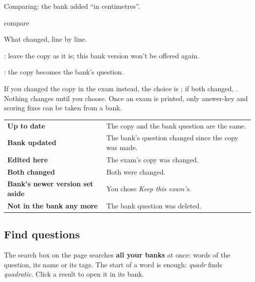 \documentclass[11pt]{article}
\begin{document}
\begin{keep}
\begin{guidefig}{Comparing: the bank added ``in centimetres''.}
\begin{shot}{compare}
\end{shot}
\end{guidefig}
\begin{callouts}
  \item What changed, line by line.
  \item {}: leave the copy as it is; this bank version won't be offered again.
  \item {}: the copy becomes the bank's question.
\end{callouts}
\end{keep}

If you changed the copy in the exam instead, the choice is ; if both changed, . Nothing changes until you choose. Once an exam is printed, only answer-key and scoring fixes can be taken from a bank.

\begin{panel}
\renewcommand{\arraystretch}{1.3}\small
\begin{tabularx}{\linewidth}{@{}>{\bfseries}p{52mm}X@{}}
Up to date & The copy and the bank question are the same.\\
Bank updated & The bank's question changed since the copy was made.\\
Edited here & The exam's copy was changed.\\
Both changed & Both were changed.\\
Bank's newer version set aside & You chose \emph{Keep this exam's}.\\
Not in the bank any more & The bank question was deleted.\\
\end{tabularx}
\end{panel}

\subsection{Find questions}

The search box on the  page searches \textbf{all your banks} at once: words of the question, its name or its tags. The start of a word is enough: \emph{quadr} finds \emph{quadratic}. Click a result to open it in its bank.
\end{document}
